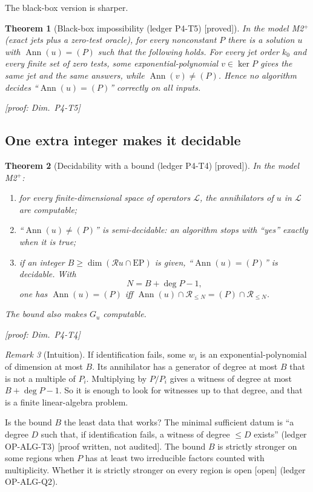 \documentclass[11pt]{article}
\theoremstyle{plain}
\newtheorem{theorem}{Theorem}[section]
\theoremstyle{definition}
\theoremstyle{remark}
\newtheorem{remark}[theorem]{Remark}
\newcommand{\ring}{\mathcal{R}}            %
\DeclareMathOperator{\Ann}{Ann}             %
\newcommand{\EP}{\mathrm{EP}}               %
\DeclareMathOperator{\dimc}{dim}
\newcommand{\badge}[2]{\textcolor{#1}{\textsf{\footnotesize[#2]}}}
\newcommand{\proved}[1][]{\badge{cC}{proved#1}}
\newcommand{\openq}{\badge{cB}{open}}
\newcommand{\led}[1]{\textcolor{cG}{\textsf{\footnotesize(ledger #1)}}}
\newenvironment{intuition}{\begin{remark}[Intuition]}{\end{remark}}
\newcommand{\dimref}[1]{\textsf{\footnotesize[proof: Dim.~#1]}}
\newcommand{\pw}{\badge{cD}{proof written, not audited}}
\begin{document}
The black-box version is sharper.

\begin{theorem}[{Black-box impossibility \led{P4-T5} \proved}]\label{f:thm:blackbox}
In the model M2$^+$ (exact jets plus a zero-test oracle), for every nonconstant $P$ there is a solution $u$ with $\Ann(u)=(P)$ such that the following holds. For every jet order $k_0$ and every finite set of zero tests, some exponential-polynomial $v\in\ker P$ gives the same jet and the same answers, while $\Ann(v)\ne(P)$. Hence no algorithm decides ``$\Ann(u)=(P)$'' correctly on all inputs.

\dimref{P4-T5}
\end{theorem}

\subsection{One extra integer makes it decidable}

\begin{theorem}[{Decidability with a bound \led{P4-T4} \proved}]\label{thm:decide}
In the model M2$^+$:
\begin{enumerate}[label=(\roman*)]
\item for every finite-dimensional space of operators $\mathcal L$, the annihilators of $u$ in $\mathcal L$ are computable;
\item ``$\Ann(u)\ne(P)$'' is semi-decidable: an algorithm stops with ``yes'' exactly when it is true;
\item if an integer $B\ge\dimc(\ring u\cap\EP)$ is given, ``$\Ann(u)=(P)$'' is decidable. With
\[
N=B+\deg P-1,
\]
one has $\Ann(u)=(P)$ iff $\Ann(u)\cap\ring_{\le N}=(P)\cap\ring_{\le N}$.
\end{enumerate}
The bound also makes $G_u$ computable.

\dimref{P4-T4}
\end{theorem}

\begin{intuition}
If identification fails, some $w_i$ is an exponential-polynomial of dimension at most $B$. Its annihilator has a generator of degree at most $B$ that is not a multiple of $P_i$. Multiplying by $P/P_i$ gives a witness of degree at most $B+\deg P-1$. So it is enough to look for witnesses up to that degree, and that is a finite linear-algebra problem.
\end{intuition}

Is the bound $B$ the least data that works? The minimal sufficient datum is ``a degree $D$ such that, if identification fails, a witness of degree $\le D$ exists'' \led{OP-ALG-T3} \pw. The bound $B$ is strictly stronger on some regions when $P$ has at least two irreducible factors counted with multiplicity. Whether it is strictly stronger on every region is open \openq{} \led{OP-ALG-Q2}.
\end{document}
